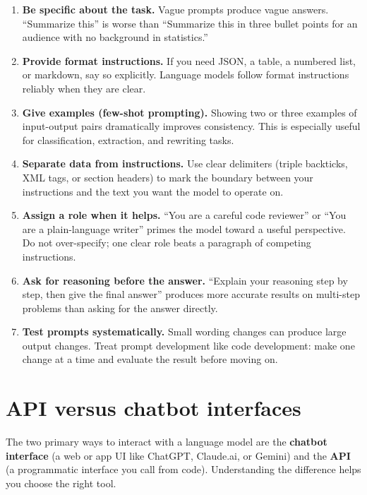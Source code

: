 \begin{enumerate}[noitemsep,topsep=0pt]
  \item \textbf{Be specific about the task.} Vague prompts produce vague answers. ``Summarize this'' is worse than ``Summarize this in three bullet points for an audience with no background in statistics.''
  \item \textbf{Provide format instructions.} If you need JSON, a table, a numbered list, or markdown, say so explicitly. Language models follow format instructions reliably when they are clear.
  \item \textbf{Give examples (few-shot prompting).} Showing two or three examples of input-output pairs dramatically improves consistency. This is especially useful for classification, extraction, and rewriting tasks.
  \item \textbf{Separate data from instructions.} Use clear delimiters (triple backticks, XML tags, or section headers) to mark the boundary between your instructions and the text you want the model to operate on.
  \item \textbf{Assign a role when it helps.} ``You are a careful code reviewer'' or ``You are a plain-language writer'' primes the model toward a useful perspective. Do not over-specify; one clear role beats a paragraph of competing instructions.
  \item \textbf{Ask for reasoning before the answer.} ``Explain your reasoning step by step, then give the final answer'' produces more accurate results on multi-step problems than asking for the answer directly.
  \item \textbf{Test prompts systematically.} Small wording changes can produce large output changes. Treat prompt development like code development: make one change at a time and evaluate the result before moving on.
\end{enumerate}


\section{API versus chatbot interfaces}

The two primary ways to interact with a language model are the \textbf{chatbot interface} (a web or app UI like ChatGPT, Claude.ai, or Gemini) and the \textbf{API} (a programmatic interface you call from code). Understanding the difference helps you choose the right tool.

